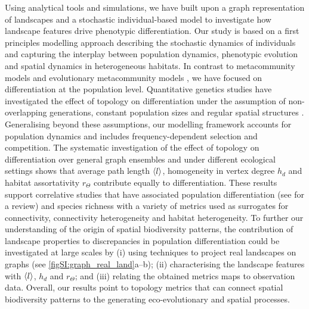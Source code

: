   Using analytical tools and simulations, we have built upon a graph representation of landscapes and a stochastic individual-based model to investigate how landscape features drive phenotypic differentiation.
  Our study is based on a first principles modelling approach \cite{Champagnat2006} describing the stochastic dynamics of individuals and capturing the interplay between population dynamics, phenotypic evolution and spatial dynamics in heterogeneous habitats. In contrast to metacommunity models \cite{Holland2008,Gilarranz2012,Mari2014,Gravel2016,Carrara2012,Thompson2017,Suzuki2021} and evolutionary metacommunity models \cite{Economo2007,Economo2010}, we have focused on differentiation at the population level. Quantitative genetics studies have investigated the effect of topology on differentiation under the assumption of non-overlapping generations, constant population sizes and regular spatial structures \cite{Burger2000,Kimura1964,Lande1991,Nagylaki1994}. Generalising beyond these assumptions, our modelling framework accounts for population dynamics and includes frequency-dependent selection and competition. The systematic investigation of the effect of topology on differentiation over general graph ensembles and under different ecological settings shows that average path length $\langle l \rangle$, homogeneity in vertex degree $h_d$ and habitat assortativity $r_\Theta$ contribute equally to differentiation.
  These results support correlative studies that have associated population differentiation (see \cite{Manel2003} for a review) and species richness \cite{Liu2018,Dias2014,Rahbek2001,Kreft2007a,Davies2007,Veech2007,Guegan1998,Stein2014} with a variety of metrics used as surrogates for connectivity, connectivity heterogeneity and habitat heterogeneity. 
  To further our understanding of the origin of spatial biodiversity patterns, the contribution of landscape properties to discrepancies in population differentiation could be investigated at large scales by (i) using techniques to project real landscapes on graphs (see \cref{figSI:graph_real_land}a--b); (ii) characterising the landscape features with $\langle l \rangle$, $h_d$ and $r_\Theta$; and (iii) relating the obtained metrics maps to observation data.
  Overall, our results point to topology metrics that can connect spatial biodiversity patterns to the generating eco-evolutionary and spatial processes.
  
